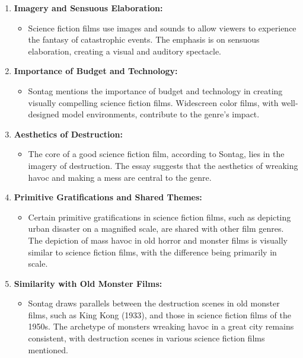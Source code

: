 \documentclass[11pt,fleqn]{book}
\begin{document}
\begin{enumerate}[label=\arabic*.]
    \item \textbf{Imagery and Sensuous Elaboration:}
    \begin{itemize}
        \item Science fiction films use images and sounds to allow viewers to experience the fantasy of catastrophic events. The emphasis is on sensuous elaboration, creating a visual and auditory spectacle.
    \end{itemize}

    \item \textbf{Importance of Budget and Technology:}
    \begin{itemize}
        \item Sontag mentions the importance of budget and technology in creating visually compelling science fiction films. Widescreen color films, with well-designed model environments, contribute to the genre's impact.
    \end{itemize}

    \item \textbf{Aesthetics of Destruction:}
    \begin{itemize}
        \item The core of a good science fiction film, according to Sontag, lies in the imagery of destruction. The essay suggests that the aesthetics of wreaking havoc and making a mess are central to the genre.
    \end{itemize}
    \item \textbf{Primitive Gratifications and Shared Themes:}
    \begin{itemize}
        \item Certain primitive gratifications in science fiction films, such as depicting urban disaster on a magnified scale, are shared with other film genres. The depiction of mass havoc in old horror and monster films is visually similar to science fiction films, with the difference being primarily in scale.
    \end{itemize}

    \item \textbf{Similarity with Old Monster Films:}
    \begin{itemize}
        \item Sontag draws parallels between the destruction scenes in old monster films, such as King Kong (1933), and those in science fiction films of the 1950s. The archetype of monsters wreaking havoc in a great city remains consistent, with destruction scenes in various science fiction films mentioned.
    \end{itemize}


\end{enumerate}
\end{document}
